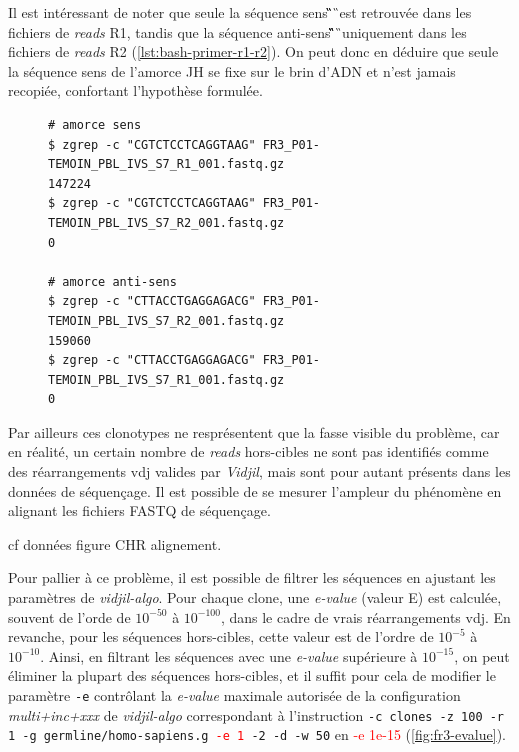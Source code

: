 Il est intéressant de noter que seule la séquence sens \C\G\T\C\T\C\C\T\C\A\G\G\T\A\A\G\ est retrouvée dans les fichiers de \textit{reads} 
R1, tandis que la séquence anti-sens \C\T\T\A\C\C\T\G\A\G\G\A\G\A\C\G\ uniquement dans les fichiers de \textit{reads} 
R2 (\autoref{lst:bash-primer-r1-r2}). On peut donc en déduire que seule la séquence sens de l'amorce JH se fixe sur 
le brin d'ADN et n'est jamais recopiée, confortant l'hypothèse formulée.


\begin{figure}[H]
\begin{lstlisting}[language=custombash, 
    caption={Commande Bash et résultat de la recherche des séquences des amorces dans les fichiers FASTQ R1 et R2.},
    label={lst:bash-primer-r1-r2},
basicstyle=\ttfamily\small]
# amorce sens
$ zgrep -c "CGTCTCCTCAGGTAAG" FR3_P01-TEMOIN_PBL_IVS_S7_R1_001.fastq.gz
147224
$ zgrep -c "CGTCTCCTCAGGTAAG" FR3_P01-TEMOIN_PBL_IVS_S7_R2_001.fastq.gz
0

# amorce anti-sens
$ zgrep -c "CTTACCTGAGGAGACG" FR3_P01-TEMOIN_PBL_IVS_S7_R2_001.fastq.gz
159060
$ zgrep -c "CTTACCTGAGGAGACG" FR3_P01-TEMOIN_PBL_IVS_S7_R1_001.fastq.gz
0
\end{lstlisting}
\end{figure}
    
Par ailleurs ces clonotypes ne resprésentent que la fasse visible du problème, car en réalité, un certain nombre de \textit{reads} 
hors-cibles ne sont pas identifiés comme des réarrangements \gls{vdj} valides par \textit{Vidjil}, mais sont pour autant présents 
dans les données de séquençage. Il est possible de  se mesurer l'ampleur du phénomène en alignant les fichiers FASTQ de séquençage.

\vspace{1em}

cf données figure CHR alignement.

\vspace{1em}

Pour pallier à ce problème, il est possible de filtrer les séquences en ajustant les paramètres de \textit{vidjil-algo}.
Pour chaque clone, une \textit{e-value} (valeur E) est calculée, souvent de l'orde de $10^{-50}$ à $10^{-100}$, dans le 
cadre de vrais réarrangements \gls{vdj}. En revanche, pour les séquences hors-cibles, cette valeur est de l'ordre de $10^{-5}$ à $10^{-10}$. 
Ainsi, en filtrant les séquences avec une \textit{e-value} supérieure à $10^{-15}$, on peut éliminer la plupart des séquences hors-cibles, et 
il suffit pour cela de modifier le paramètre \texttt{-e} contrôlant la \textit{e-value} maximale autorisée de la configuration \textit{multi+inc+xxx} 
de \textit{vidjil-algo} correspondant à l'instruction \texttt{-c clones -z 100 -r 1 -g germline/homo-sapiens.g \textcolor{red}{-e 1} -2 -d -w 50} 
en \textcolor{red}{-e 1e-15} (\autoref{fig:fr3-evalue}).

